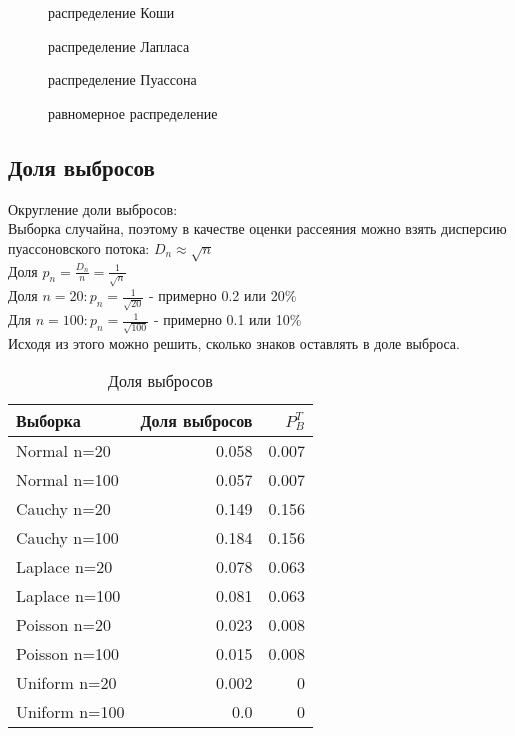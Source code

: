 \documentclass[a4paper]{article}
\begin{document}
\begin{figure}[H]
\label{fig:image}
\caption{распределение Коши} 
\end{figure}

\begin{figure}[H]
\label{fig:image}
\caption{распределение Лапласа} 
\end{figure}

\begin{figure}[H]
\label{fig:image}
\caption{распределение Пуассона} 
\end{figure}

\begin{figure}[H]
\label{fig:image}
\caption{равномерное распределение} 
\end{figure}							

\subsection{Доля выбросов}

\noindent Округление доли выбросов:\\
Выборка случайна, поэтому в качестве оценки рассеяния можно взять дисперсию пуассоновского потока:  $D_n \approx \sqrt{n}$\\
Доля $p_n = \frac{D_n}{n}=\frac{1}{\sqrt{n}}$\\
Доля $n=20: p_n=\frac{1}{\sqrt{20}}$ - примерно 0.2 или 20\% \\
Для $n=100: p_n=\frac{1}{\sqrt{100}}$ - примерно 0.1 или 10\% \\
Исходя из этого можно решить, сколько знаков оставлять в доле выброса.
\begin{table}[H]
		\centering
		\begin{tabular}[t]{lrr}
			\hline
			Выборка   &      Доля выбросов	& $P_B^T$		\\
			\hline
			Normal n=20   	&	0.058		& 0.007		\\
			Normal n=100   	&  	0.057		& 0.007\\
			\hline
			Cauchy n=20 	& 	0.149		& 0.156		\\
			Cauchy n=100	&  	0.184		& 0.156\\
			\hline
			Laplace n=20	& 	0.078	& 0.063	\\
			Laplace n=100	&   0.081		& 0.063\\
			\hline
			Poisson n=20	&	0.023		& 0.008		\\
			Poisson n=100	&	0.015		& 0.008	\\
			\hline
			Uniform n=20	&	0.002		& 0		\\
			Uniform n=100	&	0.0		& 0	\\
			\hline
		\end{tabular}
		\caption{Доля выбросов}
		\label{tab:normal}
	\end{table}
\end{document}
